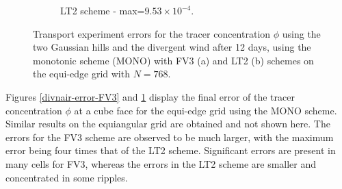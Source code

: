 \documentclass[preprint,12pt]{elsarticle}
\begin{document}
\begin{linenumbers}
\begin{figure}[!htb]
\begin{subfigure}{0.45\textwidth}
		\caption{LT2 scheme - max=$9.53 \times 10^{-4}$.\label{divnair-error-LT2}}
	\end{subfigure}
	\caption{
		Transport experiment errors for the tracer concentration $\phi$ using the two Gaussian hills  and  the divergent wind  after 12 days, using the monotonic scheme (MONO)
		with FV3 (a) and LT2 (b) schemes on the equi-edge grid  with $N=768$.
		\label{divnair-error}}
\end{figure}

Figures \ref{divnair-error-FV3} and \ref{divnair-error-LT2} display the final error of the tracer concentration $\phi$ at a cube face for the equi-edge grid using the MONO scheme.
Similar results on the equiangular grid are obtained and not shown here.
The errors for the FV3 scheme are observed to be much larger, with the maximum error being four times that of the LT2 scheme. 
Significant errors are present in many cells for FV3, whereas the errors in the LT2 scheme are smaller and concentrated in some ripples.


\end{linenumbers}
\end{document}
